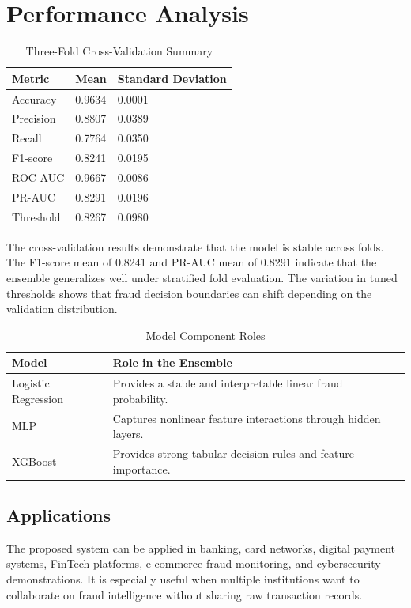 \section{Performance Analysis}
\begin{table}[H]
\centering
\caption{Three-Fold Cross-Validation Summary}
\begin{tabular}{|p{4cm}|p{4cm}|p{4cm}|}
\hline
\textbf{Metric} & \textbf{Mean} & \textbf{Standard Deviation} \\
\hline
Accuracy & 0.9634 & 0.0001 \\
\hline
Precision & 0.8807 & 0.0389 \\
\hline
Recall & 0.7764 & 0.0350 \\
\hline
F1-score & 0.8241 & 0.0195 \\
\hline
ROC-AUC & 0.9667 & 0.0086 \\
\hline
PR-AUC & 0.8291 & 0.0196 \\
\hline
Threshold & 0.8267 & 0.0980 \\
\hline
\end{tabular}
\end{table}

The cross-validation results demonstrate that the model is stable across folds. The F1-score mean of 0.8241 and PR-AUC mean of 0.8291 indicate that the ensemble generalizes well under stratified fold evaluation. The variation in tuned thresholds shows that fraud decision boundaries can shift depending on the validation distribution.

\begin{table}[H]
\centering
\caption{Model Component Roles}
\begin{tabular}{|p{4cm}|p{9cm}|}
\hline
\textbf{Model} & \textbf{Role in the Ensemble} \\
\hline
Logistic Regression & Provides a stable and interpretable linear fraud probability. \\
\hline
MLP & Captures nonlinear feature interactions through hidden layers. \\
\hline
XGBoost & Provides strong tabular decision rules and feature importance. \\
\hline
\end{tabular}
\end{table}

\subsection{Applications}
The proposed system can be applied in banking, card networks, digital payment systems, FinTech platforms, e-commerce fraud monitoring, and cybersecurity demonstrations. It is especially useful when multiple institutions want to collaborate on fraud intelligence without sharing raw transaction records.

